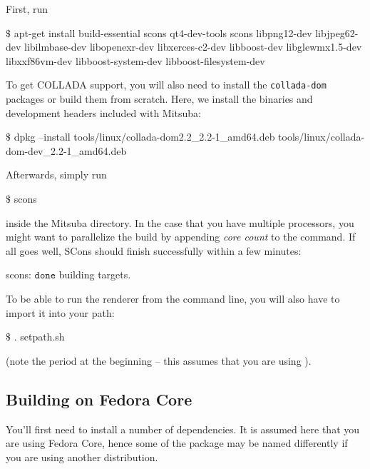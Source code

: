 First, run
\begin{shell}
$\text{\$}$ apt-get install build-essential scons qt4-dev-tools scons libpng12-dev libjpeg62-dev libilmbase-dev libopenexr-dev libxerces-c2-dev libboost-dev libglewmx1.5-dev libxxf86vm-dev libboost-system-dev libboost-filesystem-dev
\end{shell}
To get COLLADA support, you will also need to install the \texttt{collada-dom} packages or build them from scratch. Here, we install the  binaries and development headers included with Mitsuba:
\begin{shell}
$\text{\$}$ dpkg --install tools/linux/collada-dom2.2_2.2-1_amd64.deb tools/linux/collada-dom-dev_2.2-1_amd64.deb
\end{shell}
Afterwards, simply run
\begin{shell}
$\text{\$}$ scons
\end{shell}
inside the Mitsuba directory. In the case that you have multiple processors, you might want to parallelize the build by appending \emph{core count} to the command.
If all goes well, SCons should finish successfully within a few minutes:
\begin{shell}
scons: $\texttt{done}$ building targets.
\end{shell}
To be able to run the renderer from the command line, you will also have to import it into your path:
\begin{shell}
$\text{\$}$ . setpath.sh
\end{shell}
(note the period at the beginning -- this assumes that you are using ).

\subsection{Building on Fedora Core}
You'll first need to install a number of dependencies. It is assumed here
that you are using Fedora Core, hence some of the package may be named differently if you are 
using another distribution.

